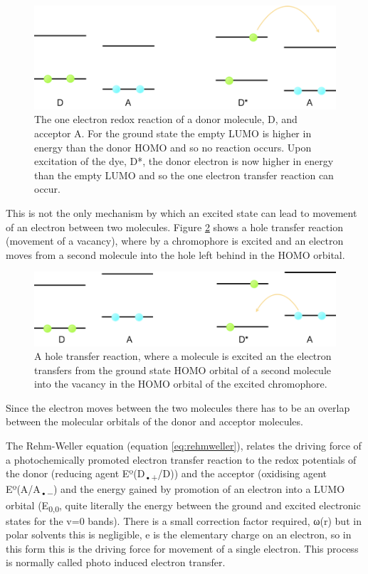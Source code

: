 \documentclass[
]{book}
\begin{document}
\begin{figure}

{\centering \includegraphics[width=0.6\linewidth]{images/donoret} 

}

\caption{The one electron redox reaction of a donor molecule, D, and acceptor A. For the ground state the empty LUMO is higher in energy than the donor HOMO and so no reaction occurs. Upon excitation of the dye, D*, the donor electron is now higher in energy than the empty LUMO and so the one electron transfer reaction can occur.}\label{fig:donoret}
\end{figure}

This is not the only mechanism by which an excited state can lead to movement of an electron between two molecules. Figure \ref{fig:acceptoret} shows a hole transfer reaction (movement of a vacancy), where by a chromophore is excited and an electron moves from a second molecule into the hole left behind in the HOMO orbital.

\begin{figure}

{\centering \includegraphics[width=0.6\linewidth]{images/acceptoret} 

}

\caption{A hole transfer reaction, where a molecule is excited an the electron transfers from the ground state HOMO orbital of a second molecule into the vacancy in the HOMO orbital of the excited chromophore.}\label{fig:acceptoret}
\end{figure}

Since the electron moves between the two molecules there has to be an overlap between the molecular orbitals of the donor and acceptor molecules.

The Rehm-Weller equation (equation \eqref{eq:rehmweller}), relates the driving force of a photochemically promoted electron transfer reaction to the redox potentials of the donor (reducing agent Eº(D\textsubscript{•+}/D)) and the acceptor (oxidising agent Eº(A/A\textsubscript{•−}) and the energy gained by promotion of an electron into a LUMO orbital (E\textsubscript{0,0}, quite literally the energy between the ground and excited electronic states for the v=0 bands). There is a small correction factor required, ω(r) but in polar solvents this is negligible, e is the elementary charge on an electron, so in this form this is the driving force for movement of a single electron. This process is normally called photo induced electron transfer.
\end{document}
